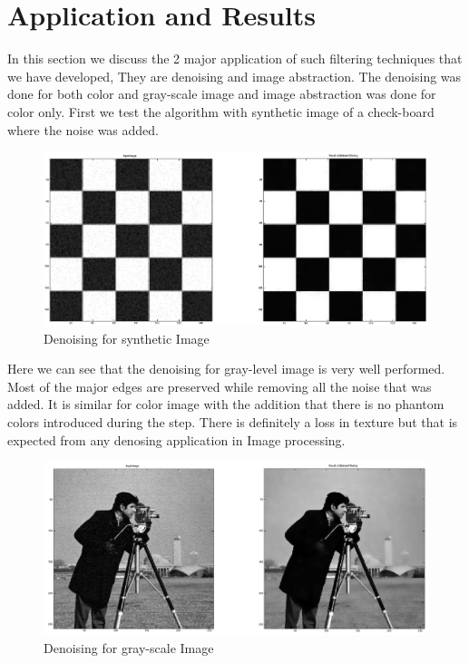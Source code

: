 \documentclass[12pt]{article}
\begin{document}
\section{Application and Results}
In this section we discuss the 2 major application of such filtering techniques that we have developed, They are denoising and image abstraction. The denoising was done for both color and gray-scale image and image abstraction was done for color only. First we test the algorithm with synthetic image of a check-board where the noise was added. 


\begin{figure}[ht!]
        \centering
                \includegraphics[width=\textwidth]{syn1}
                \caption{Denoising for synthetic Image}
\end{figure}

Here we can see that the denoising for gray-level image is very well performed. Most of the major edges are preserved while removing all the noise that was added. It is similar for color image with the addition that there is no phantom colors introduced during the step.  There is definitely a loss in texture but that is expected from any denosing application in Image processing.


\begin{figure}[ht!]
        \centering
                \includegraphics[width=\textwidth]{bw1}
                \caption{Denoising for gray-scale Image}
\end{figure}
\end{document}
